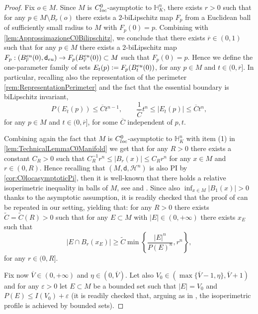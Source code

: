 \documentclass[a4paper,12pt,reqno]{amsart}
\numberwithin{equation}{section}
\theoremstyle{plain}
\theoremstyle{definition}
\theoremstyle{remark}
\newcommand{\eps}{\varepsilon}
\newcommand{\eqdef}{\ensuremath{\vcentcolon=}}
\newcommand{\haus}{\mathcal{H}}
\newcommand{\dist}{\mathsf{d}}
\begin{document}
{\begin{proof}
Fix $o \in M$. Since $M$ is $C^0_{\rm loc}$-asymptotic to $\mathbb{H}^n_K$, there exists $r>0$ such that for any $p \in M \setminus B_r(o)$ there exists a $2$-biLipschitz map $F_p$ from a Euclidean ball of sufficiently small radius to $M$ with $F_p(0)=p$. Combining with \cref{lem:ApprossimazioneC0Bilipschitz}, we conclude that there exists $\overline{r} \in (0,1)$ such that for any $p \in M$ there exists a $2$-biLipschitz map $F_p:(B_{\overline{r}}^{\rm eu}(0), \dist_{\rm eu} )\to F_p(B_{\overline{r}}^{\rm eu}(0)) \subset M$ such that $F_p(0)=p$. Hence we define the one-parameter family of sets $E_t(p) \eqdef F_p(B_t^{\rm eu}(0))$, for any $p \in M$ and $t \in (0,\overline{r}]$. In particular, recalling also the representation of the perimeter \cref{rem:RepresentationPerimeter} and the fact that the essential boundary is biLipschitz invariant,
\begin{equation}
	P(E_t(p)) \le \overline{C} t^{n-1}, 
	\qquad
	\frac{1}{\overline{C}} t^n \le |E_t(p)| \le \overline{C}t^n,
\end{equation}
for any $p \in M$ and $t \in (0,\overline{r}]$, for some $\overline{C}$ independent of $p,t$.

Combining again the fact that $M$ is $C^0_{\rm loc}$-asymptotic to $\mathbb{H}^n_K$ with item (1) in \cref{lem:TechnicalLemmaC0Manifold} we get that for any $R>0$ there exists a constant $C_R>0$ such that $C_R^{-1}r^n \le |B_r(x)| \le C_R r^n$ for any $x \in M$ and $r\in (0,R)$. Hence recalling that $(M, \dist, \haus^n)$ is also PI by \cref{cor:C0locasymptoticPi}, then it is well-known that there holds a relative isoperimetric inequality in balls of $M$, see \cite[Theorem 5.1]{HajlaszKoskela} and \cite[Remark 4.4]{Ambrosio02}. Since also $\inf_{x\in M} |B_1(x)| >0$ thanks to the asymptotic assumption, it is readily checked that the proof of \cite[Lemma 2.10]{ANP} can be repeated in our setting, yielding that: for any $R>0$ there exists $\widetilde{C}=\widetilde{C}(R)>0$ such that for any $E \subset M$ with $|E| \in (0,+\infty)$ there exists $x_E$ such that
\begin{equation}\label{eq:LocalMassLowerBound}
|E \cap B_r(x_E)| \ge \widetilde{C} \min\left\{ \frac{|E|^n}{P(E)^n} , r^n \right\},	
\end{equation}
for any $r \in (0,R]$.

Fix now $\overline{V} \in (0,+\infty)$ and $\eta \in (0,\overline{V})$. Let also $V_0 \in (\max\{\overline{V}-1, \eta\}, \overline{V}+1)$ and for any $\eps>0$ let $E\subset M$ be a bounded set such that $|E|=V_0$ and $P(E) \le I(V_0) + \eps$ (it is readily checked that, arguing as in \cite[Lemma 2.17]{AFP21}, the isoperimetric profile is achieved by bounded sets).


\end{proof}}
\end{document}
